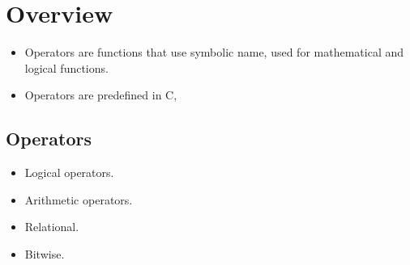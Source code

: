 \section{Overview}
\begin{itemize}
    \item Operators are functions that use symbolic name, used for mathematical and logical functions. 
    \item Operators are predefined in C, 
\end{itemize}
\subsection{Operators}
\begin{itemize}
    \item Logical operators. 
    \item Arithmetic operators. 
    \item Relational.
    \item Bitwise. 
\end{itemize}

